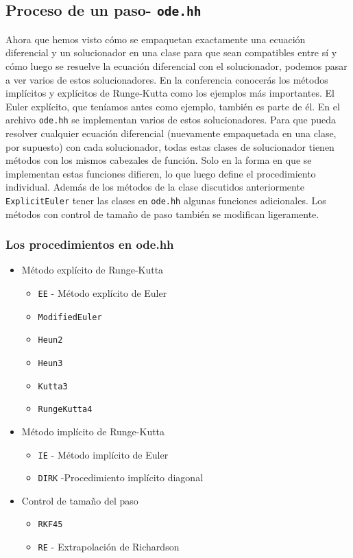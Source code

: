 \documentclass[a4paper,11pt]{article}
\theoremstyle{definition}
\begin{document}
\subsection{Proceso de un paso- \lstinline{ode.hh}}

Ahora que hemos visto cómo se empaquetan exactamente una ecuación diferencial y un solucionador en una clase
para que sean compatibles entre sí y cómo luego se resuelve la ecuación diferencial con el solucionador, podemos pasar a ver varios de estos solucionadores. En la conferencia conocerás los métodos implícitos y explícitos de Runge-Kutta como los ejemplos más importantes. El Euler explícito, que teníamos antes como ejemplo, también es parte de él. En el archivo \lstinline{ode.hh}
se implementan varios de estos solucionadores. Para que pueda resolver cualquier ecuación diferencial (nuevamente empaquetada en una clase, por supuesto) con cada solucionador, todas estas clases de solucionador tienen métodos con los mismos cabezales de función. Solo en la forma en que se implementan estas funciones difieren, lo que luego define el procedimiento individual. Además de los métodos de la clase discutidos anteriormente \lstinline{ExplicitEuler} tener las clases en
\lstinline{ode.hh} algunas funciones adicionales. Los métodos con control de tamaño de paso también se modifican ligeramente.


\subsubsection{Los procedimientos en ode.hh}
\begin{itemize}
\item Método explícito de Runge-Kutta 
  \begin{itemize}
  \item\lstinline{EE} - Método explícito de Euler
  \item\lstinline{ModifiedEuler}
  \item\lstinline{Heun2}
  \item\lstinline{Heun3}
  \item\lstinline{Kutta3}
  \item\lstinline{RungeKutta4}
  \end{itemize}
\item Método implícito de Runge-Kutta 
  \begin{itemize}
  \item \lstinline{IE} - Método implícito de Euler
  \item \lstinline{DIRK} -Procedimiento implícito diagonal
  \end{itemize}
\item Control de tamaño del paso
  \begin{itemize}
  \item\lstinline{RKF45}
  \item\lstinline{RE} - Extrapolación de Richardson
  \end{itemize}
\end{itemize}
\end{document}
